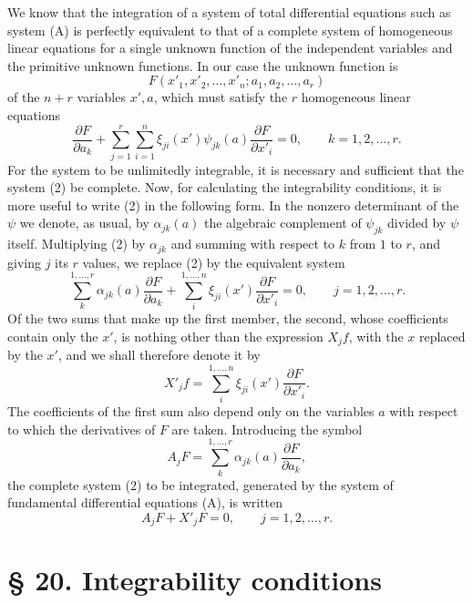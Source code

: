 \documentclass[11pt]{book}
\begin{document}
We know that the integration of a system of total differential equations such as system (A) is perfectly equivalent to that of a complete system of homogeneous linear equations for a single unknown function of the independent variables and the primitive unknown functions. In our case the unknown function is
\[
 F(x'_1,x'_2,\ldots,x'_n; a_1,a_2,\ldots,a_r)
\]
of the $n+r$ variables $x',a$, which must satisfy the $r$ homogeneous linear equations
\begin{equation*}\tag{2}
 \frac{\partial F}{\partial a_k}+\sum\limits_{j=1}^r\sum\limits_{i=1}^n\xi_{ji}(x')\psi_{jk}(a)\frac{\partial F}{\partial x'_i}=0,
 \qquad k=1,2,\ldots,r.
\end{equation*}
For the system to be unlimitedly integrable, it is necessary and sufficient that the system (2) be complete. Now, for calculating the integrability conditions, it is more useful to write (2) in the following form. In the nonzero determinant of the $\psi$ we denote, as usual, by $\alpha_{jk}(a)$ the algebraic complement of $\psi_{jk}$ divided by $\psi$ itself. Multiplying (2) by $\alpha_{jk}$ and summing with respect to $k$ from $1$ to $r$, and giving $j$ its $r$ values, we replace (2) by the equivalent system
\begin{equation*}\tag{2*}
 \sum\limits_k^{1,\ldots,r}\alpha_{jk}(a)\frac{\partial F}{\partial a_k}+\sum\limits_i^{1,\ldots,n}\xi_{ji}(x')\frac{\partial F}{\partial x'_i}=0,
 \qquad j=1,2,\ldots,r.
\end{equation*}
Of the two sums that make up the first member, the second, whose coefficients contain only the $x'$, is nothing other than the expression $X_jf$, with the $x$ replaced by the $x'$, and we shall therefore denote it by
\[
 X'_jf=\sum\limits_i^{1,\ldots,n}\xi_{ji}(x')\frac{\partial F}{\partial x'_i}.
\]
The coefficients of the first sum also depend only on the variables $a$ with respect to which the derivatives of $F$ are taken. Introducing the symbol
\begin{equation*}\tag{3}
 A_jF=\sum\limits_k^{1,\ldots,r}\alpha_{jk}(a)\frac{\partial F}{\partial a_k},
\end{equation*}
the complete system (2) to be integrated, generated by the system of fundamental differential equations (A), is written
\begin{equation*}\tag{C'}
 A_jF+X'_jF=0,\qquad j=1,2,\ldots,r.
\end{equation*}

\section*{\S{} 20. Integrability conditions}
\end{document}
